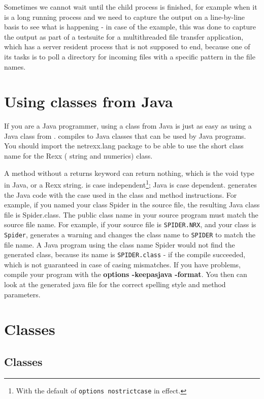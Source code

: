 {Sometimes we cannot wait until the child process is finished, for
example when it is a long running process and we need to capture the
output on a line-by-line basis to see what is happening - in case of
the example, this was done to capture the output as part of a
testsuite for a multithreaded file transfer application, which has a
server resident process that is not supposed to end, because one of
its tasks is to poll a directory for incoming files with a specific
pattern in the file names. 

\chapter{Using \nr{} classes from Java}
If you are a Java programmer, using a \nr{} class from Java is just as
easy as using a Java class from \nr{}. \nr{} compiles to Java classes that can be used by Java programs.
You should import the netrexx.lang package to be able to use the short
class name for the Rexx (\nr{} string and numerics) class.

A \nr{} method without a returns keyword can return nothing, which is the void type in Java, or a Rexx string. 
\nr{}is case independent\footnote{With the default of \texttt{options
  nostrictcase} in effect.}; Java is case dependent. \nr{} generates
the Java code with the case used in the class and method
instructions. For example, if you named your class Spider in the \nr{}
source file, the resulting Java class file is Spider.class.
The public class name in your source program must match the \nr{}
source file name. For example, if your source file is \texttt{SPIDER.NRX}, and
your class is \texttt{Spider}, \nr{} generates a warning and changes the
class name to \texttt{SPIDER} to match the file name. A Java program using the
class name Spider would not find the generated class, because its name
is \texttt{SPIDER.class} - if the compile succeeded, which is not guaranteed in
case of casing mismatches.
If you have problems, compile your \nr{} program with the \textbf{options
-keepasjava -format}. You then can look at the generated java file for the correct spelling style and method parameters.

\chapter{Classes}\label{classes}
\section{Classes}
}
